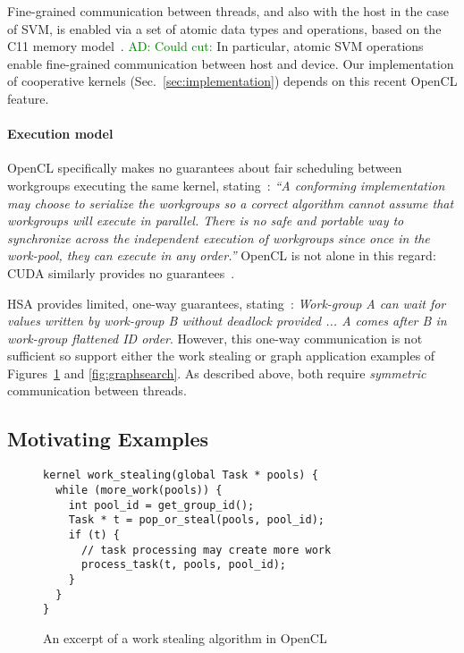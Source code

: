\documentclass[numbers,nocopyrightspace,10pt]{sigplanconf}
\newcommand{\ADComment}[1]{\textcolor{green}{AD: #1}}
\newcommand{\mysec}{Sec.~}
\begin{document}
Fine-grained communication between threads, and also with the host in
the case of SVM, is enabled via a set of atomic data types and
operations, based on the C11 memory model~\cite{...}.  \ADComment{Could cut:} In particular,
atomic SVM operations enable fine-grained communication between host
and device.  Our implementation of cooperative kernels
(\mysec\ref{sec:implementation}) depends on this recent OpenCL
feature.

\paragraph{Execution model}

OpenCL specifically makes no guarantees about fair scheduling between
workgroups executing the same kernel, stating~\cite{...}: \emph{``A
  conforming implementation may choose to serialize the workgroups so
  a correct algorithm cannot assume that workgroups will execute in
  parallel.  There is no safe and portable way to synchronize across
  the independent execution of workgroups since once in the work-pool,
  they can execute in any order.''}  OpenCL is not alone in this
regard: CUDA similarly provides no guarantees~\cite{...}.

HSA provides limited, one-way guarantees,
stating~\cite[p. 46]{HSAprogramming11}: \emph{Work-group A can wait
  for values written by work-group B without deadlock provided ... A
  comes after B in work-group flattened ID order}. However, this
one-way communication is not sufficient so support either the
work stealing or graph application examples of
Figures~\ref{fig:workstealing} and \ref{fig:graphsearch}. As described
above, both require \emph{symmetric} communication between
threads.


\subsection{Motivating Examples}\label{sec:openclexamples}

\begin{figure}

\begin{lstlisting}
kernel work_stealing(global Task * pools) {
  while (more_work(pools)) {
    int pool_id = get_group_id();
    Task * t = pop_or_steal(pools, pool_id);
    if (t) {
      // task processing may create more work
      process_task(t, pools, pool_id);
    }
  }
}
\end{lstlisting}

\caption{An excerpt of a work stealing algorithm in OpenCL}\label{fig:workstealing}
\end{figure}
\end{document}
